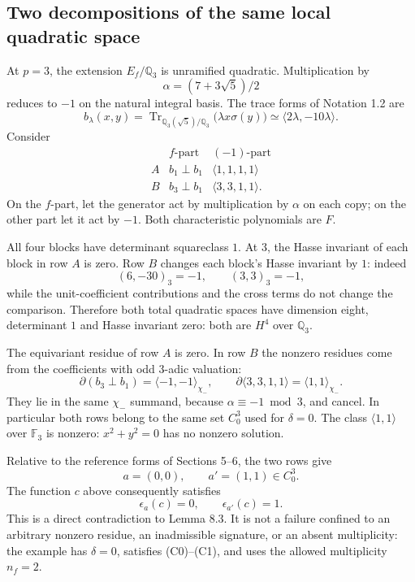 \documentclass[10pt]{article}
\begin{document}
\subsection*{Two decompositions of the same local quadratic space}
At \(p=3\), the extension \(E_f/\mathbb Q_3\) is unramified quadratic. Multiplication by \[\alpha=(7+3\sqrt5)/2\] reduces to \(-1\) on the natural integral basis. The trace forms of Notation 1.2 are \[b_\lambda(x,y)=\operatorname{Tr}_{\mathbb Q_3(\sqrt5)/\mathbb Q_3}
       \bigl(\lambda x\sigma(y)\bigr)
       \simeq \langle2\lambda,-10\lambda\rangle.\] Consider \[\begin{array}{c|cc}
 & f\text{-part}&(-1)\text{-part}\\ \hline
 A&b_1\perp b_1&\langle1,1,1,1\rangle\\
 B&b_3\perp b_1&\langle3,3,1,1\rangle .
\end{array}\] On the \(f\)-part, let the generator act by multiplication by \(\alpha\) on each copy; on the other part let it act by \(-1\). Both characteristic polynomials are \(F\).\par
All four blocks have determinant squareclass \(1\). At \(3\), the Hasse invariant of each block in row \(A\) is zero. Row \(B\) changes each block’s Hasse invariant by \(1\): indeed \[(6,-30)_3=-1,\qquad (3,3)_3=-1,\] while the unit-coefficient contributions and the cross terms do not change the comparison. Therefore both total quadratic spaces have dimension eight, determinant \(1\) and Hasse invariant zero: both are \(H^4\) over \(\mathbb Q_3\).\par
The equivariant residue of row \(A\) is zero. In row \(B\) the nonzero residues come from the coefficients with odd \(3\)-adic valuation: \[\partial(b_3\perp b_1)=
      \langle-1,-1\rangle_{\chi_-},\qquad
 \partial\langle3,3,1,1\rangle=
      \langle1,1\rangle_{\chi_-}.\] They lie in the same \(\chi_-\) summand, because \(\alpha\equiv-1\bmod3\), and cancel. In particular both rows belong to the same set \(C^3_0\) used for \(\delta=0\). The class \(\langle1,1\rangle\) over \(\mathbb F_3\) is nonzero: \(x^2+y^2=0\) has no nonzero solution.\par
Relative to the reference forms of Sections 5–6, the two rows give \[a=(0,0),\qquad a'=(1,1)\in C^3_0.\] The function \(c\) above consequently satisfies \[\epsilon_a(c)=0,\qquad \epsilon_{a'}(c)=1.\] This is a direct contradiction to Lemma 8.3. It is not a failure confined to an arbitrary nonzero residue, an inadmissible signature, or an absent multiplicity: the example has \(\delta=0\), satisfies (C0)–(C1), and uses the allowed multiplicity \(n_f=2\).\par
\end{document}
